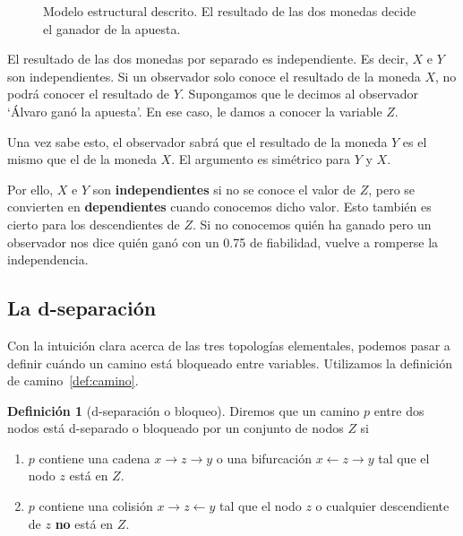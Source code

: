 \documentclass[a4paper,11pt,spanish, twoside]{tfg-uam-matematicas_25-26}
\theoremstyle{definition}
\newtheorem{defin}[teor]{Definición}
\begin{document}
\begin{figure}[ht]
    \centering
{}
\caption{Modelo estructural descrito. El resultado de las dos monedas decide el ganador de la apuesta.}
\label{fig:grafo-interruptor-colision}
\end{figure}

El resultado de las dos monedas por separado es independiente. Es decir, $X$ e $Y$ son independientes. Si un observador solo conoce el resultado de la moneda $X$, no podrá conocer el resultado de $Y$. Supongamos que le decimos al observador `Álvaro ganó la apuesta'. En ese caso, le damos a conocer la variable $Z$.

Una vez sabe esto, el observador sabrá que el resultado de la moneda $Y$ es el mismo que el de la moneda $X$. El argumento es simétrico para $Y$ y $X$.

Por ello, $X$ e $Y$ son \textbf{independientes} si no se conoce el valor de $Z$, pero se convierten en \textbf{dependientes} cuando conocemos dicho valor. Esto también es cierto para los descendientes de $Z$. Si no conocemos quién ha ganado pero un observador nos dice quién ganó con un 0.75 de fiabilidad, vuelve a romperse la independencia.

\subsection{La d-separación}
Con la intuición clara acerca de las tres topologías elementales, podemos pasar a definir cuándo un camino está bloqueado entre variables. Utilizamos la definición de camino~\ref{def:camino}.

\begin{defin}[d-separación o bloqueo]
Diremos que un camino $p$ entre dos nodos está d-separado o bloqueado por un conjunto de nodos $Z$ si
\begin{enumerate}
    \item $p$ contiene una cadena $x \rightarrow z \rightarrow y$ o una bifurcación $x \leftarrow z \rightarrow y$ tal que el nodo $z$ está en $Z$.
    \item $p$ contiene una colisión $x \rightarrow z \leftarrow y$ tal que el nodo $z$ o cualquier descendiente de $z$ \textbf{no} está en $Z$.
\end{enumerate}
\end{defin}
\end{document}

